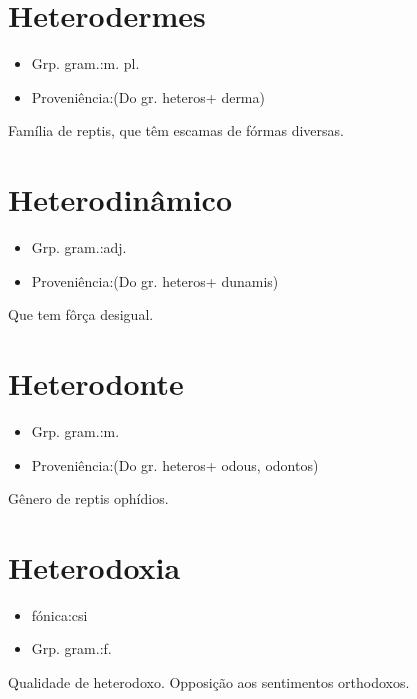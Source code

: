 \documentclass{article}
\begin{document}
\section{Heterodermes}
\begin{itemize}
\item {Grp. gram.:m. pl.}
\end{itemize}
\begin{itemize}
\item {Proveniência:(Do gr. \textunderscore heteros\textunderscore  + \textunderscore derma\textunderscore )}
\end{itemize}
Família de reptis, que têm escamas de fórmas diversas.
\section{Heterodinâmico}
\begin{itemize}
\item {Grp. gram.:adj.}
\end{itemize}
\begin{itemize}
\item {Proveniência:(Do gr. \textunderscore heteros\textunderscore  + \textunderscore dunamis\textunderscore )}
\end{itemize}
Que tem fôrça desigual.
\section{Heterodonte}
\begin{itemize}
\item {Grp. gram.:m.}
\end{itemize}
\begin{itemize}
\item {Proveniência:(Do gr. \textunderscore heteros\textunderscore  + \textunderscore odous\textunderscore , \textunderscore odontos\textunderscore )}
\end{itemize}
Gênero de reptis ophídios.
\section{Heterodoxia}
\begin{itemize}
\item {fónica:csi}
\end{itemize}
\begin{itemize}
\item {Grp. gram.:f.}
\end{itemize}
Qualidade de heterodoxo.
Opposição aos sentimentos orthodoxos.
\end{document}

